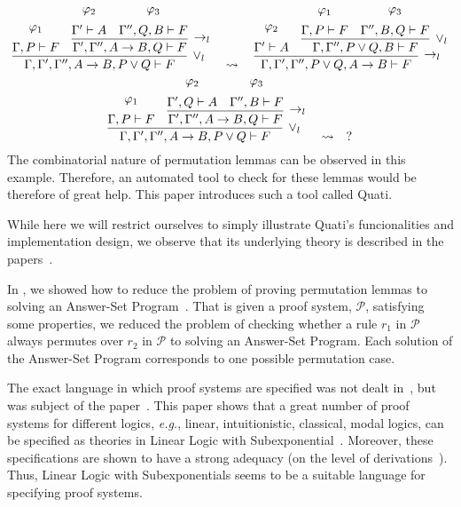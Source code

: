 \documentclass{llncs}
\newcommand\Pscr{\mathcal{P}}
\newcommand{\eg}{{\em e.g.}}
\begin{document}
{\scriptsize
\[
\infer[\vee_l]{\Gamma, \Gamma', \Gamma'', A \rightarrow B , P \vee Q \vdash F}{
  \deduce{\Gamma, P \vdash F}{\varphi_1\vspace{0.2cm}}
  &
  \infer[\rightarrow_l]{\Gamma', \Gamma'', A \rightarrow B , Q \vdash F}{
    \deduce{\Gamma' \vdash A}{\varphi_2\vspace{0.2cm}}
    &
    \deduce{\Gamma'', Q, B \vdash F}{\varphi_3\vspace{0.2cm}}
  }
}
\quad\rightsquigarrow\quad
\infer[\rightarrow_l]{\Gamma, \Gamma', \Gamma'', P \vee Q, A \rightarrow B
\vdash F}{
  \deduce{\Gamma' \vdash A}{\varphi_2\vspace{0.2cm}}
  &
  \infer[\vee_l]{\Gamma, \Gamma'', P \vee Q, B \vdash F}{
    \deduce{\Gamma, P \vdash F}{\varphi_1\vspace{0.2cm}}
    &
    \deduce{\Gamma'', B, Q \vdash F}{\varphi_3\vspace{0.2cm}}
  }
}
\]
}
{\scriptsize
\[
\infer[\vee_l]{\Gamma, \Gamma', \Gamma'', A \rightarrow B , P \vee Q \vdash F}{
  \deduce{\Gamma, P \vdash F}{\varphi_1\vspace{0.2cm}}
  &
  \infer[\rightarrow_l]{\Gamma', \Gamma'', A \rightarrow B , Q \vdash F}{
    \deduce{\Gamma', Q \vdash A}{\varphi_2\vspace{0.2cm}}
    &
    \deduce{\Gamma'', B \vdash F}{\varphi_3\vspace{0.2cm}}
  }
}
\quad\rightsquigarrow\quad
?
\]
}%
The combinatorial nature of permutation lemmas can be observed in this example.
Therefore, an automated tool to check for these lemmas
would be therefore of great help. This paper introduces such a tool called Quati.

While here we will restrict ourselves to simply illustrate Quati's funcionalities and implementation design, 
we observe that its underlying theory is described in the papers~\cite{nigam.jlc,nigam13iclp,nigam14ebl}. 
 
In \cite{nigam13iclp}, we showed how to reduce the problem of proving permutation lemmas to solving an Answer-Set
Program~\cite{gelfond}. That is given a proof system, $\Pscr$, satisfying some properties, we reduced the problem 
of checking whether a rule $r_1$ in $\Pscr$ always permutes over $r_2$ in $\Pscr$ to solving an Answer-Set Program.
Each solution of the Answer-Set Program corresponds to one possible permutation case. 

The exact language in which proof systems are specified was not dealt in~\cite{nigam13iclp}, but was subject of 
the paper~\cite{nigam.jlc}. This paper shows that a great number of proof systems for different logics,
\eg, linear, intuitionistic, classical, modal logics, can be specified as theories in Linear Logic with Subexponential~\cite{nigam09ppdp}. Moreover, these specifications are shown to have a strong adequacy (on the level of derivations~\cite{nigam10jar}). Thus, Linear Logic
with Subexponentials seems to be a suitable language for specifying proof systems. 
\end{document}
